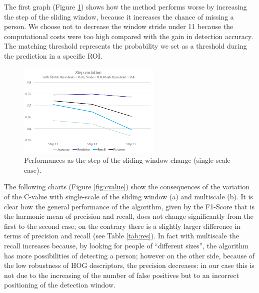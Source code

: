 \documentclass[a4paper, 10pt, onecolumn]{article} %
\begin{document}
The first graph (Figure \ref{fig:step}) shows how the method performs worse by increasing the step of the sliding window, because it increases the chance of missing a person. We choose not to decrease the window stride under 11 because the computational costs were too high compared with the gain in detection accuracy. The matching threshold represents the probability we set as a threshold during the prediction in a specific ROI.
\begin{figure}[h!]
\centering
\includegraphics[height=4.5cm]{step_variation.png} 
\caption{Performances as the step of the sliding window change (single scale case).}
\label{fig:step}
\end{figure}

The following charts (Figure \ref{fig:cvalue}) show the consequences of the variation of the C-value with single-scale of the sliding window (a) and multiscale (b).  It is clear how the general performance of the algorithm, given by the F1-Score that is the harmonic mean of precision and recall, does not change significantly from the first to the second case; on the contrary there is a slightly larger difference in terms of precision and recall (see Table \ref{tab:res}). In fact with multiscale the recall increases because, by looking for people of ``different sizes'', the algorithm has more possibilities of detecting a person; however on the other side, because of the low robustness of HOG descriptors,  the precision decreases: in our case this is not due to the increasing of the number of false positives but to an incorrect positioning of the detection window. 
\end{document}
